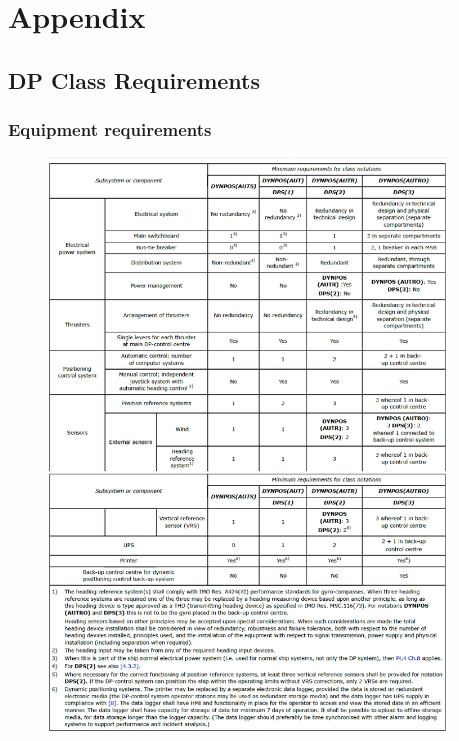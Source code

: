 \newpage
\section*{Appendix}\label{Appendix}
\appendix
\renewcommand{\thesubsection}{\Alph{subsection}}

\subsection{DP Class Requirements}\label{Sec:DP_Class_Requirements} 

\subsubsection{Equipment requirements}\label{Sec:Equipment_Requirements}
\begin{figure}[h]
    \centering
    \includegraphics[width = 0.95\textwidth, height = 0.73\textheight]{figures/DP_requirements_table.eps}
\end{figure}


